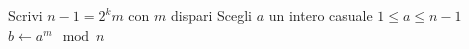 \vspace{1em}
\begin{algorithm}[H]
    \SetAlgoVlined
    \SetAlgoLined
    \caption{MillerRabin($n$)}
    \label{alg:miller_rabin}

    Scrivi $n-1 = 2^km$ con $m$ dispari\;
    Scegli $a$ un intero casuale $1 \leq a \leq n-1$\;
    $b \gets a^m \mod n$\;

    \;
    
\end{algorithm}
\vspace{2em}
